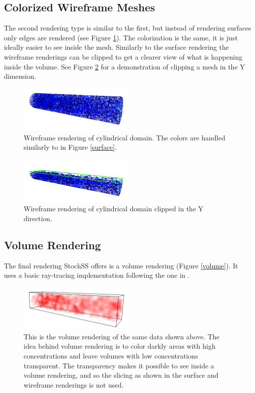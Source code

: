 \subsection{Colorized Wireframe Meshes}

The second rendering type is similar to the first, but instead of rendering surfaces only edges are rendered (see Figure \ref{wireframe}). The colorization is the same, it is just ideally easier to see inside the mesh. Similarly to the surface rendering the wireframe renderings can be clipped to get a clearer view of what is happening inside the volume. See Figure \ref{clipy} for a demonstration of clipping a mesh in the Y dimension.

\begin{figure}[!ht]
  \centering
    \includegraphics[width=0.5\textwidth]{wireframe}
  \caption{ Wireframe rendering of cylindrical domain. The colors are handled similarly to in Figure \ref{surface}. }
  \label{wireframe}
\end{figure}

\begin{figure}[!ht]
  \centering
    \includegraphics[width=0.5\textwidth]{clipy}
  \caption{ Wireframe rendering of cylindrical domain clipped in the Y direction. }
  \label{clipy}
\end{figure}

\subsection{Volume Rendering}

The final rendering StochSS offers is a volume rendering (Figure \ref{volume}). It uses a basic ray-tracing implementation following the one in \cite{congote}.

\begin{figure}[!ht]
  \centering
    \includegraphics[width=0.5\textwidth]{volume}
  \caption{ This is the volume rendering of the same data shown above. The idea behind volume rendering is to color darkly areas with high concentrations and leave volumes with low concentrations transparent. The transparency makes it possible to see inside a volume rendering, and so the slicing as shown in the surface and wireframe renderings is not used. }
  \label{ volume }
\end{figure}

